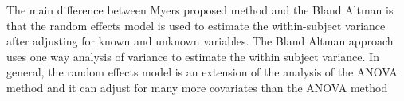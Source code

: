 The main difference between  Myers proposed method and the Bland Altman is that the random effects model is used to estimate the within-subject variance after adjusting for known and unknown variables. The Bland Altman approach uses one way analysis of variance to estimate the within subject variance.
In general, the random effects model is an extension of the analysis of the ANOVA method and it can adjust for many more covariates than the ANOVA method

